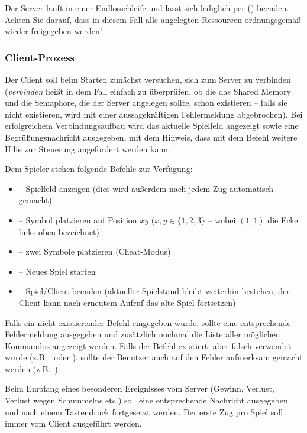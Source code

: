 Der Server läuft in einer Endlosschleife und lässt sich lediglich per
 () beenden. Achten Sie darauf, dass in
diesem Fall alle angelegten Ressourcen ordnungsgemäß wieder freigegeben werden!

\subsubsection*{Client-Prozess}
Der Client soll beim Starten zunächst versuchen, sich zum Server zu verbinden
(\emph{verbinden} heißt in dem Fall einfach zu überprüfen, ob die das Shared
Memory und die Semaphore, die der Server angelegen sollte, schon existieren --
falls sie nicht existieren, wird mit einer aussagekräftigen Fehlermeldung
abgebrochen). Bei erfolgreichem Verbindungsaufbau wird das aktuelle Spielfeld
angezeigt sowie eine Begrüßungsnachricht ausgegeben, mit dem Hinweis, dass mit
dem Befehl  weitere Hilfe zur Steuerung angefordert werden kann.

Dem Spieler stehen folgende Befehle zur Verfügung:

\begin{itemize}
	\item {} -- Spielfeld anzeigen (dies wird außerdem nach jedem
	                     Zug automatisch gemacht)
	\item {} -- Symbol platzieren auf Position \(xy\)
	                          (\(x, y \in \{1, 2, 3\}\) -- wobei $(1, 1)$
	                          die Ecke links oben bezeichnet)
	\item {} -- zwei Symbole platzieren (Cheat-Modus)
	\item {} -- Neues Spiel starten
	\item {} -- Spiel/Client beenden (aktueller Spielstand bleibt
	                     weiterhin bestehen; der Client kann nach erneutem
	                     Aufruf das alte Spiel fortsetzen)
\end{itemize}

Falls ein nicht existierender Befehl eingegeben wurde, sollte eine entsprechende
Fehlermeldung ausgegeben und zusätzlich nochmal die Liste aller möglichen
Kommandos angezeigt werden. Falls der Befehl existiert, aber falsch verwendet
wurde (z.B.\  oder ), sollte der Benutzer auch auf
den Fehler aufmerksam gemacht werden (z.B.\ ).

Beim Empfang eines besonderen Ereignisses vom Server (Gewinn, Verlust, Verlust
wegen Schummelns etc.) soll eine entsprechende Nachricht ausgegeben und nach
einem Tastendruck fortgesetzt werden. Der erste Zug pro Spiel soll immer vom
Client ausgeführt werden.


